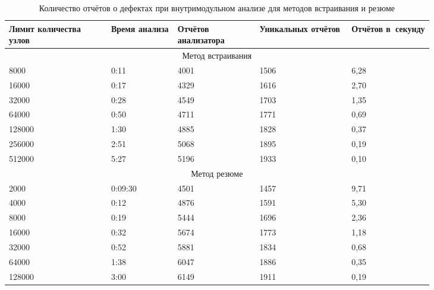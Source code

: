 \begin{table}
\renewcommand{\arraystretch}{1.2}
\begin{tabular}{| p{0.2\linewidth} | p{0.13\linewidth} | p{0.16\linewidth} | p{0.18\linewidth} |  p{0.16\linewidth} |} 
\hline
Лимит количества узлов & Время анализа & Отчётов анализатора & Уникальных отчётов & Отчётов в~секунду \\
\hline
\multicolumn{5}{|c|}{Метод встраивания} \\
\hline
\hline
8000      &   0:11       & 4001  & 1506 & 6,28 \\
\hline
16000     &   0:17       & 4329  & 1616 & 2,70 \\
\hline
32000     &   0:28       & 4549  & 1703 & 1,35 \\
\hline
64000     &   0:50       & 4711  & 1771 & 0,69 \\
\hline
128000    &   1:30       & 4885  & 1828 & 0,37 \\
\hline
256000    &   2:51       & 5068  & 1895 & 0,19 \\
\hline
512000    &   5:27       & 5196  & 1933 & 0,10 \\
\hline
\hline
\multicolumn{5}{|c|}{Метод резюме} \\
\hline
\hline
2000      &   0:09:30    & 4501  & 1457 & 9,71 \\
\hline
4000      &   0:12       & 4876  & 1591 & 5,30 \\
\hline
8000      &   0:19       & 5444  & 1696 & 2,36 \\
\hline
16000     &   0:32       & 5674  & 1773 & 1,18 \\
\hline
32000     &   0:52       & 5881  & 1834 & 0,68 \\
\hline
64000     &   1:38       & 6047  & 1886 & 0,35 \\
\hline
128000    &   3:00       & 6149  & 1911 & 0,19 \\
\hline
\hline

\end{tabular}
\caption{Количество отчётов о дефектах при внутримодульном анализе для методов встраивания и резюме} \label{table:time-defect-single}
\end{table}


